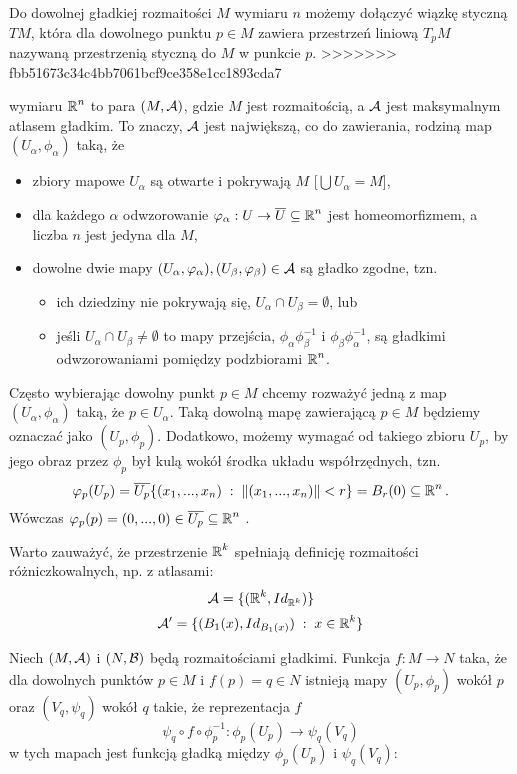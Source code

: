 Do dowolnej gładkiej rozmaitości $M$ wymiaru $n$ możemy dołączyć wiązkę styczną $TM$, która dla dowolnego punktu $p\in M$ zawiera przestrzeń liniową $T_pM$ nazywaną przestrzenią styczną do $M$ w punkcie $p$. 
>>>>>>> fbb51673c34c4bb7061bcf9ce358e1cc1893cda7

\begin{definition}\label{def:rozmaitosci rozniczkowalna}
   wymiaru $\operatorname{\mathbb{R}}^n$ to para $(M,\mathcal{A})$, gdzie $M$ jest rozmaitością, a $\mathcal{A}$ jest maksymalnym atlasem gładkim. To znaczy, $\mathcal{A}$ jest największą, co do zawierania, rodziną map $(U_\alpha,\phi_\alpha)$ taką, że 
  \begin{itemize}
    \item zbiory mapowe $U_\alpha$ są otwarte i pokrywają $M$ [$\bigcup U_{\alpha}=M$],
    \item dla każdego $\alpha$ odwzorowanie $\varphi_\alpha:U\to \overline{U}\subseteq\operatorname{\mathbb{R}}^n$ jest homeomorfizmem, a liczba $n$ jest jedyna dla $M$,
    \item dowolne dwie mapy $(U_\alpha,\varphi_\alpha), (U_\beta,\varphi_\beta)\in\mathcal{A}$ są gładko zgodne, tzn. 
      \begin{itemize}
        \item ich dziedziny nie pokrywają się, $U_\alpha\cap U_\beta=\emptyset$, lub
        \item jeśli $U_\alpha\cap U_\beta\neq \emptyset$ to mapy przejścia, $\phi_\alpha\phi_\beta^{-1}$ i $\phi_\beta\phi_\alpha^{-1}$, są gładkimi odwzorowaniami pomiędzy podzbiorami $\operatorname{\mathbb{R}}^n$.
      \end{itemize}
  \end{itemize}
\end{definition}

Często wybierając dowolny punkt $p\in M$ chcemy rozważyć jedną z map $(U_\alpha,\phi_\alpha)$ taką, że $p\in U_\alpha$. Taką dowolną mapę zawierającą $p\in M$ będziemy oznaczać jako $(U_p,\phi_p)$. Dodatkowo, możemy wymagać od takiego zbioru $U_p$, by jego obraz przez $\phi_p$ był kulą wokół środka układu współrzędnych, tzn.
$$\varphi_p(U_p)=\overline{U_p}\{(x_1,...,x_n)\;:\;\|(x_1,...,x_n)\| < r\}=B_r(0)\subseteq\operatorname{\mathbb{R}}^n.$$
Wówczas $\varphi_p(p)=(0,...,0)\in\overline{U_p}\subseteq\operatorname{\mathbb{R}}^n$ \cite{leeSmoothManifolds}.

Warto zauważyć, że przestrzenie $\operatorname{\mathbb{R}}^k$ spełniają definicję rozmaitości różniczkowalnych, np. z atlasami: 
$$\mathcal{A}=\{(\operatorname{\mathbb{R}}^k,Id_{\operatorname{\mathbb{R}}^k})\}$$
$$\mathcal{A}'=\{ (B_1(x), Id_{B_1(x)}) \;:\;x\in\operatorname{\mathbb{R}}^k\}$$

\begin{definition}\label{def:funkcja gładka}
  Niech $(M, \mathcal{A})$ i $(N,\mathcal{B})$ będą rozmaitościami gładkimi. Funkcja $f:M\to N$ taka, że dla dowolnych punktów $p\in M$ i $f(p)=q\in N$ istnieją mapy $(U_p,\phi_p)$ wokół $p$ oraz $(V_q,\psi_q)$ wokół $q$ takie, że reprezentacja $f$ 
  $$\psi_q\circ f\circ\phi_p^{-1}:\phi_p(U_p)\to \psi_q(V_q)$$
  w tych mapach jest funkcją gładką między $\phi_p(U_p)$ i $\psi_q(V_q)$:
\end{definition}

